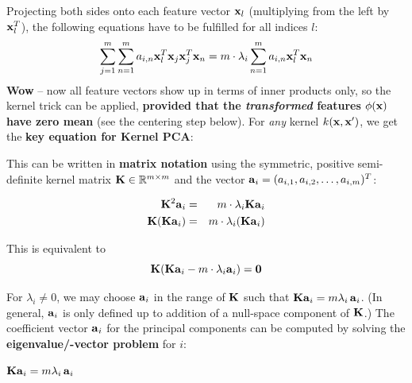 	Projecting both sides onto each feature vector $\bm{\mathrm{x}}_l$ (multiplying from the left by $\bm{\mathrm{x}}_l^T$), the following equations have to be fulfilled for all indices $l$:
		      \begin{displaymath}
			      \sum_{j=1}^m\sum_{n=1}^m a_{i,n}\bm{\mathrm{x}}_l^T \bm{\mathrm{x}}_j \bm{\mathrm{x}}_j^T\bm{\mathrm{x}}_n =
			      m \cdot \lambda_i \sum_{n=1}^m a_{i,n} \bm{\mathrm{x}}_l^T\bm{\mathrm{x}}_n
		      \end{displaymath}
	\textbf{Wow} -- now all feature vectors show up in terms of inner products only, so the kernel trick can be applied, \textbf{provided that the \emph{transformed} features $\phi(\bm{\mathrm{x}})$ have zero mean} (see the centering step below). For \emph{any} kernel $k(\bm{\mathrm{x}}, \bm{\mathrm{x}}')$, we get the \textbf{key equation for Kernel PCA}:
		      \begin{center}
		      \end{center}
 	This can be written in \textbf{matrix notation} using the symmetric, positive semi-definite kernel matrix $\mathbf{K}\in \mathbb{R}^{m\times m}$ and the vector $\bm{\mathrm{a}}_i = (a_{i,1}, a_{i,2}, \dots, a_{i,m})^T$:

	\begin{eqnarray*}
		\mathbf{K}^2 \bm{\mathrm{a}}_i        &=& m\cdot \lambda_i \mathbf{K} \bm{\mathrm{a}}_i\\
		\mathbf{K} (\mathbf{K} \bm{\mathrm{a}}_i) &=& m\cdot \lambda_i ( \mathbf{K} \bm{\mathrm{a}}_i)
	\end{eqnarray*}
	
  	This is equivalent to
	\begin{displaymath}
		\mathbf{K} (\mathbf{K} {\bm{\mathrm{a}}}_i - m\cdot \lambda_i \bm{\mathrm{a}}_i) = \bm{\mathrm{0}}
	\end{displaymath}

	For $\lambda_i\neq 0$, we may choose $\bm{\mathrm{a}}_i$ in the range of $\mathbf{K}$ such that $\mathbf{K}\bm{\mathrm{a}}_i = m\lambda_i\,\bm{\mathrm{a}}_i$. (In general, $\bm{\mathrm{a}}_i$ is only defined up to addition of a null-space component of $\mathbf{K}$.)
  	The coefficient vector $\bm{\mathrm{a}}_i$ for the principal components can be computed by solving the \textbf{eigenvalue/-vector problem} for $i$: \\

	\begin{center}
		$\mathbf{K} {\bm{\mathrm{a}}}_i = m \lambda_i  \, \bm{\mathrm{a}}_i$
	\end{center}
  
